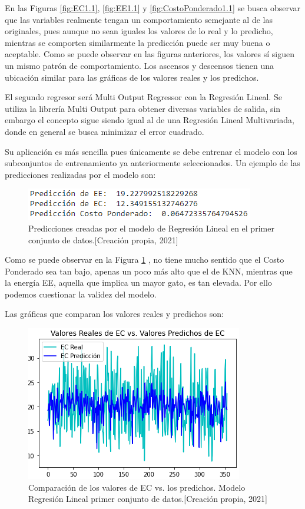 \documentclass{article}
\begin{document}
En las Figuras \ref{fig:EC1.1}, \ref{fig:EE1.1} y \ref{fig:CostoPonderado1.1} se busca observar que las variables realmente tengan un comportamiento semejante al de las originales, pues aunque no sean iguales los valores de lo real y lo predicho, mientras se comporten similarmente la predicción puede ser muy buena o aceptable. Como se puede observar en las figuras anteriores, los valores sí siguen un mismo patrón de comportamiento. Los ascensos y descensos tienen una ubicación similar para las gráficas de los valores reales y los predichos. 

El segundo regresor será Multi Output Regressor con la Regresión Lineal. Se utiliza la librería Multi Output para obtener diversas variables de salida, sin embargo el concepto sigue siendo igual al de una Regresión Lineal Multivariada, donde en general se busca minimizar el error cuadrado.

Su aplicación es más sencilla pues únicamente se debe entrenar el modelo con los subconjuntos de entrenamiento ya anteriormente seleccionados. Un ejemplo de las predicciones realizadas por el modelo son: 

\begin{figure}[!h]
    \centering
    \includegraphics[scale=.7]{F4/F4-im8.PNG}
    \caption{Predicciones creadas por el modelo de Regresión Lineal en el primer conjunto de datos.[Creación propia, 2021]}
    \label{fig:predicciones1.2}
\end{figure}

Como se puede observar en la Figura \ref{fig:predicciones1.2} , no tiene mucho sentido que el Costo Ponderado sea tan bajo, apenas un poco más alto que el de KNN, mientras que la energía EE, aquella que implica un mayor gato, es tan elevada. Por ello podemos cuestionar la validez del modelo. 

Las gráficas que comparan los valores reales y predichos son: 
\begin{figure}[!h]
    \centering
    \includegraphics[scale=.7]{F4/F4-im9.PNG}
    \caption{Comparación de los valores de EC vs. los predichos. Modelo Regresión Lineal primer conjunto de datos.[Creación propia, 2021]}
    \label{fig:EC1.2}
\end{figure}
\end{document}
